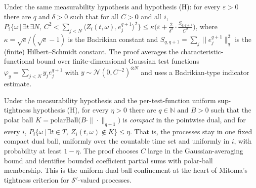 \begin{theorem}\label{thm:mit-gaussian-bound}
  \leanok
  Under the same measurability hypothesis and hypothesis (H): for every $\varepsilon > 0$ there are
  $q$ and $\delta > 0$ such that for all $C > 0$ and all $i$,
  $P_i\bigl\{\omega \,\big|\, \exists t\, \exists N,\ C^2 < \sum_{j < N}
  \langle Z_i(t,\omega), e^{q+1}_j\rangle^2 \bigr\}
  \le \kappa \bigl(\varepsilon + \tfrac{2}{\delta^2} \cdot \tfrac{S_{q,q+1}}{C^2}\bigr)$,
  where $\kappa = \sqrt{e}/(\sqrt{e}-1)$ is the Badrikian constant and
  $S_{q,q+1} = \sum_j \|e^{q+1}_j\|_q^2$ is the (finite) Hilbert--Schmidt constant.  The proof
  averages the characteristic-functional bound over finite-dimensional Gaussian test functions
  $\varphi_y = \sum_{j<N} y_j e^{q+1}_j$ with $y \sim \mathcal{N}(0, C^{-2})^{\otimes N}$ and uses a
  Badrikian-type indicator estimate.
\end{theorem}

\begin{theorem}\label{thm:mit-confinement}
  \leanok
  Under the measurability hypothesis and the per-test-function uniform sup-tightness hypothesis
  (H), for every $\eta > 0$ there are $q \in \mathbb{N}$ and $B > 0$ such that the polar ball
  $K = \mathrm{polarBall}\bigl(B \cdot \|\cdot\|_{q+1}\bigr)$ is \emph{compact} in the pointwise
  dual, and for every $i$,
  $P_i\bigl\{\omega \,\big|\, \exists t \in T,\ Z_i(t,\omega) \notin K\bigr\} \le \eta$.
  That is, the processes stay in one fixed compact dual ball, uniformly over the countable time set
  and uniformly in $i$, with probability at least $1-\eta$.  The proof chooses $C$ large in the
  Gaussian-averaging bound and identifies bounded coefficient partial sums with polar-ball
  membership.  This is the uniform dual-ball confinement at the heart of Mitoma's tightness
  criterion for $\mathcal{S}'$-valued processes.
\end{theorem}
